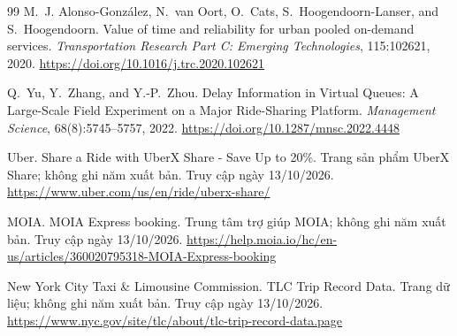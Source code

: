 \begin{thebibliography}{99}
M.~J. Alonso-González, N.~van Oort, O.~Cats, S.~Hoogendoorn-Lanser, and S.~Hoogendoorn.
\newblock Value of time and reliability for urban pooled on-demand services.
\newblock \emph{Transportation Research Part C: Emerging Technologies}, 115:102621, 2020.
\newblock \url{https://doi.org/10.1016/j.trc.2020.102621}

Q.~Yu, Y.~Zhang, and Y.-P.~Zhou.
\newblock Delay Information in Virtual Queues: A Large-Scale Field Experiment on a Major Ride-Sharing Platform.
\newblock \emph{Management Science}, 68(8):5745--5757, 2022.
\newblock \url{https://doi.org/10.1287/mnsc.2022.4448}

Uber.
\newblock Share a Ride with UberX Share - Save Up to 20\%.
\newblock Trang sản phẩm UberX Share; không ghi năm xuất bản. Truy cập ngày 13/10/2026.
\newblock \url{https://www.uber.com/us/en/ride/uberx-share/}

MOIA.
\newblock MOIA Express booking.
\newblock Trung tâm trợ giúp MOIA; không ghi năm xuất bản. Truy cập ngày 13/10/2026.
\newblock \url{https://help.moia.io/hc/en-us/articles/360020795318-MOIA-Express-booking}

New York City Taxi \& Limousine Commission.
\newblock TLC Trip Record Data.
\newblock Trang dữ liệu; không ghi năm xuất bản. Truy cập ngày 13/10/2026.
\newblock \url{https://www.nyc.gov/site/tlc/about/tlc-trip-record-data.page}

\end{thebibliography}
